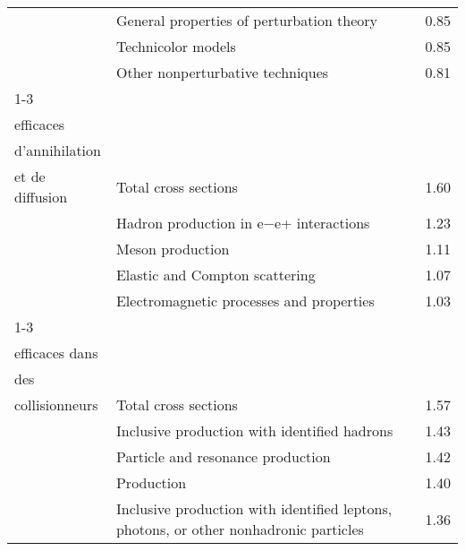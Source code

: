 \begin{longtable}[H]{p{}|p{}|p{}}
                                                                               & General properties of perturbation theory &  0.85 \\
                                                                               & Technicolor models &  0.85 \\
                                                                               & Other nonperturbative techniques &  0.81 \\
\cline{1-3}
\multirow{5}{*}{\begin{tabular}{l}Sections\\ efficaces\\ d'annihilation\\ et de diffusion\end{tabular}} & Total cross sections &  1.60 \\
                                                                               & Hadron production in e−e+ interactions &  1.23 \\
                                                                               & Meson production &  1.11 \\
                                                                               & Elastic and Compton scattering &  1.07 \\
                                                                               & Electromagnetic processes and properties &  1.03 \\
\cline{1-3}
\multirow{5}{*}{\begin{tabular}{l}Sections\\ efficaces dans\\ des\\ collisionneurs\end{tabular}} & Total cross sections &  1.57 \\
                                                                               & Inclusive production with identified hadrons &  1.43 \\
                                                                               & Particle and resonance production &  1.42 \\
                                                                               & Production &  1.40 \\
                                                                               & Inclusive production with identified leptons, photons, or other nonhadronic particles &  1.36 \\

\end{longtable}
